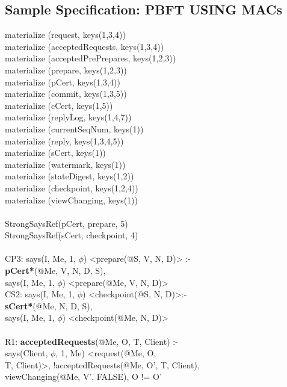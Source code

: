 \subsection{Sample Specification: PBFT USING MACs}
\begin{code}
materialize (request, keys(1,3,4))\\
materialize (acceptedRequests, keys(1,3,4))\\
materialize (acceptedPrePrepares, keys(1,2,3))\\
materialize (prepare, keys(1,2,3))\\
materialize (pCert, keys(1,3,4))\\
materialize (commit, keys(1,3,5))\\
materialize (cCert, keys(1,5))\\
materialize (replyLog, keys(1,4,7))\\
materialize (currentSeqNum, keys(1))\\
materialize (reply, keys(1,3,4,5))\\
materialize (sCert, keys(1))\\
materialize (watermark, keys(1))\\
materialize (stateDigest, keys(1,2))\\
materialize (checkpoint, keys(1,2,4))\\
materialize (viewChanging, keys(1))\\
\\
StrongSaysRef(pCert, prepare, 5)\\
StrongSaysRef(sCert, checkpoint, 4)\\
\\
CP3: says(I, Me, 1, $\phi$) <prepare(@S, V, N, D)> :- \\
\> \textbf{pCert*}(@Me, V, N, D, S), \\
\> says(I, Me, 1, $\phi$) <prepare(@Me, V, N, D)>\\
CS2: says(I, Me, 1, $\phi$) <checkpoint(@S, N, D)>:-\\
\> \textbf{sCert*}(@Me, N, D, S),\\
\> says(I, Me, 1, $\phi$) <checkpoint(@Me, N, D)>\\
\\
R1: \textbf{acceptedRequests}(@Me, O, T, Client) :- \\
\> says(Client, $\phi$, 1, Me) <request(@Me, O, \\
\> T, Client)>, !acceptedRequests(@Me, O', T, Client),\\
\> viewChanging(@Me, V', FALSE), O != O'\\

\end{code}
